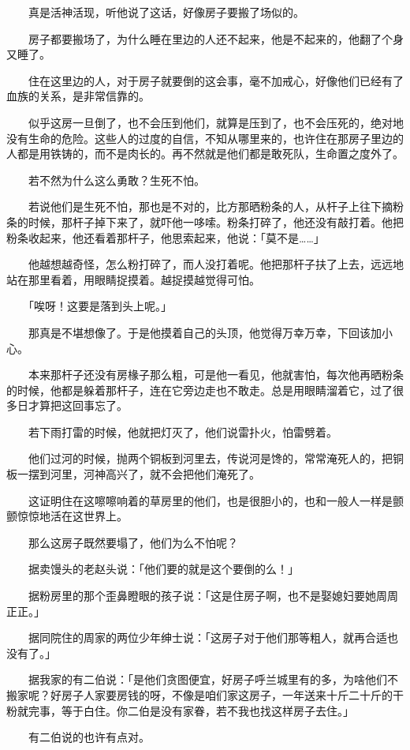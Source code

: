 \documentclass[UTF8]{ctexart}
\begin{document}
　　真是活神活现，听他说了这话，好像房子要搬了场似的。

　　房子都要搬场了，为什么睡在里边的人还不起来，他是不起来的，他翻了个身又睡了。

　　住在这里边的人，对于房子就要倒的这会事，毫不加戒心，好像他们已经有了血族的关系，是非常信靠的。

　　似乎这房一旦倒了，也不会压到他们，就算是压到了，也不会压死的，绝对地没有生命的危险。这些人的过度的自信，不知从哪里来的，也许住在那房子里边的人都是用铁铸的，而不是肉长的。再不然就是他们都是敢死队，生命置之度外了。

　　若不然为什么这么勇敢？生死不怕。

　　若说他们是生死不怕，那也是不对的，比方那晒粉条的人，从杆子上往下摘粉条的时候，那杆子掉下来了，就吓他一哆嗦。粉条打碎了，他还没有敲打着。他把粉条收起来，他还看着那杆子，他思索起来，他说：「莫不是……」

　　他越想越奇怪，怎么粉打碎了，而人没打着呢。他把那杆子扶了上去，远远地站在那里看着，用眼睛捉摸着。越捉摸越觉得可怕。

　　「唉呀！这要是落到头上呢。」

　　那真是不堪想像了。于是他摸着自己的头顶，他觉得万幸万幸，下回该加小心。

　　本来那杆子还没有房椽子那么粗，可是他一看见，他就害怕，每次他再晒粉条的时候，他都是躲着那杆子，连在它旁边走也不敢走。总是用眼睛溜着它，过了很多日才算把这回事忘了。

　　若下雨打雷的时候，他就把灯灭了，他们说雷扑火，怕雷劈着。

　　他们过河的时候，抛两个铜板到河里去，传说河是馋的，常常淹死人的，把铜板一摆到河里，河神高兴了，就不会把他们淹死了。

　　这证明住在这嚓嚓响着的草房里的他们，也是很胆小的，也和一般人一样是颤颤惊惊地活在这世界上。

　　那么这房子既然要塌了，他们为么不怕呢？

　　据卖馒头的老赵头说：「他们要的就是这个要倒的么！」

　　据粉房里的那个歪鼻瞪眼的孩子说：「这是住房子啊，也不是娶媳妇要她周周正正。」

　　据同院住的周家的两位少年绅士说：「这房子对于他们那等粗人，就再合适也没有了。」

　　据我家的有二伯说：「是他们贪图便宜，好房子呼兰城里有的多，为啥他们不搬家呢？好房子人家要房钱的呀，不像是咱们家这房子，一年送来十斤二十斤的干粉就完事，等于白住。你二伯是没有家眷，若不我也找这样房子去住。」

　　有二伯说的也许有点对。
\end{document}
